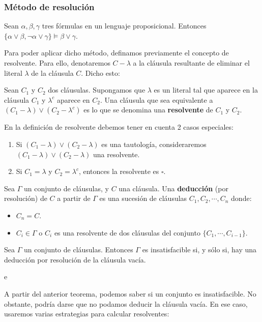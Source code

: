 \subsubsection{Método de resolución}
\begin{nth}
    Sean $\alpha,\beta,\gamma$ tres fórmulas en un lenguaje proposicional. Entonces $\{\alpha \lor \beta, \neg \alpha \lor \gamma\} \models \beta \lor \gamma$.
\end{nth}
Para poder aplicar dicho método, definamos previamente el concepto de resolvente. Para ello, denotaremos $C - \lambda$ a la cláusula resultante de eliminar el literal $\lambda$ de la cláusula $C$. Dicho esto:
\begin{ndef}
    Sean $C_1$ y $C_2$ dos cláusulas. Supongamos que $\lambda$ es un literal tal que aparece en la cláusula $C_1$ y $\lambda^c$ aparece en $C_2$. Una cláusula que sea equivalente a $(C_1 - \lambda) \lor (C_2 - \lambda^c)$ es lo que se denomina una \textbf{resolvente} de $C_1$ y $C_2$.
\end{ndef}
\begin{obs} En la definición de resolvente debemos tener en cuenta 2 casos especiales:
    \begin{enumerate}
        \item Si $(C_1-\lambda)\lor(C_2-\lambda)$ es una tautología, consideraremos $(C_1-\lambda)\lor(C_2-\lambda)$ una resolvente.
        \item Si $C_1=\lambda$ y $C_2=\lambda^c$, entonces la resolvente es $\square$.
    \end{enumerate}
\end{obs}
\begin{ndef}
    Sea $\Gamma$ un conjunto de cláusulas, y $C$ una cláusula. Una \textbf{deducción} (por resolución) de $C$ a partir de $\Gamma$ es una sucesión de cláusulas $C_1,C_2,\cdots,C_n$ donde:
    \begin{itemize}
        \item $C_n = C$.
        \item $C_i \in \Gamma$ o $C_i$ es una resolvente de dos cláusulas del conjunto $\{C_1,\cdots,C_{i-1}\}$.
    \end{itemize}
\end{ndef}
\begin{nth}
    Sea $\Gamma$ un conjunto de cláusulas. Entonces $\Gamma$ es insatisfacible si, y sólo si, hay una deducción por resolución de la cláusula vacía.
\end{nth}
\begin{ejemplo}
    e
\end{ejemplo}
A partir del anterior teorema, podemos saber si un conjunto es insatisfacible. No obstante, podría darse que no podamos deducir la cláusula vacía. En ese caso, usaremos varias estrategias para calcular resolventes:

